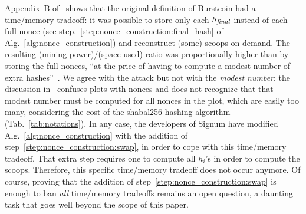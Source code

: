 Appendix~B of~\cite{ParkKFGAP18} shows that the
original definition of Burstcoin had a time/memory tradeoff:
it was possible to store only each ${h_{\mathit{final}}}$ instead of each full nonce
(see step.~\ref{step:nonce_construction:final_hash} of Alg.~\ref{alg:nonce_construction}) and
reconstruct (some) scoops on demand. The resulting (mining power)/(space used) ratio was proportionally higher
than by storing the full nonces,
``at the price of having to compute a modest number of extra hashes''~\cite{ParkKFGAP18}.
We agree with the attack but not with the \emph{modest number}: the discussion in~\cite{ParkKFGAP18}
confuses plots with nonces and does not recognize that that modest number
must be computed for all nonces in the plot, which are easily too many, considering the
cost of the shabal256 hashing algorithm (Tab.~\ref{tab:notations}). In any case, the developers
of Signum have modified Alg.~\ref{alg:nonce_construction} with the addition of
step~\ref{step:nonce_construction:swap}, in order to cope with this time/memory tradeoff.
That extra step requires one to compute all $h_i$'s in order to compute the scoops.
Therefore, this specific time/memory tradeoff does not occur anymore. Of course, proving
that the addition of step~\ref{step:nonce_construction:swap} is enough to ban \emph{all}
time/memory tradeoffs remains an open question,
a daunting task that goes well beyond the scope of this paper.

